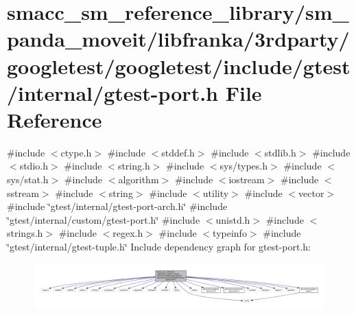 \hypertarget{gtest-port_8h}{}\section{smacc\+\_\+sm\+\_\+reference\+\_\+library/sm\+\_\+panda\+\_\+moveit/libfranka/3rdparty/googletest/googletest/include/gtest/internal/gtest-\/port.h File Reference}
\label{gtest-port_8h}
{\ttfamily \#include $<$ctype.\+h$>$}\newline
{\ttfamily \#include $<$stddef.\+h$>$}\newline
{\ttfamily \#include $<$stdlib.\+h$>$}\newline
{\ttfamily \#include $<$stdio.\+h$>$}\newline
{\ttfamily \#include $<$string.\+h$>$}\newline
{\ttfamily \#include $<$sys/types.\+h$>$}\newline
{\ttfamily \#include $<$sys/stat.\+h$>$}\newline
{\ttfamily \#include $<$algorithm$>$}\newline
{\ttfamily \#include $<$iostream$>$}\newline
{\ttfamily \#include $<$sstream$>$}\newline
{\ttfamily \#include $<$string$>$}\newline
{\ttfamily \#include $<$utility$>$}\newline
{\ttfamily \#include $<$vector$>$}\newline
{\ttfamily \#include \char`\"{}gtest/internal/gtest-\/port-\/arch.\+h\char`\"{}}\newline
{\ttfamily \#include \char`\"{}gtest/internal/custom/gtest-\/port.\+h\char`\"{}}\newline
{\ttfamily \#include $<$unistd.\+h$>$}\newline
{\ttfamily \#include $<$strings.\+h$>$}\newline
{\ttfamily \#include $<$regex.\+h$>$}\newline
{\ttfamily \#include $<$typeinfo$>$}\newline
{\ttfamily \#include \char`\"{}gtest/internal/gtest-\/tuple.\+h\char`\"{}}\newline
Include dependency graph for gtest-\/port.h\+:
\nopagebreak
\begin{figure}[H]
\begin{center}
\leavevmode
\includegraphics[width=350pt]{gtest-port_8h__incl}
\end{center}
\end{figure}
